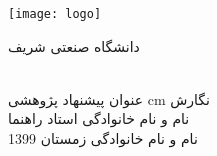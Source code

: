 \begin{center}
\thispagestyle{empty}
\texttt{[image: logo]}

\begin{large}
دانشگاه صنعتی شریف \\ \fadepart{}
\vskip 0.8cm
\fatype{} \falevel{} \\ \famajor{}

\end{large}
\vskip 2cm
{\large{عنوان پیشنهاد پژوهشی}} 
\vskip 0.5cm
{\titlefont{\textbf{\fatitle}}}
 cm
\large{نگارش} \\ \Large{نام و نام خانوادگی}
\vskip 0.75cm
\large{استاد راهنما} \\ \Large{نام و نام خانوادگی}
\vskip 2cm
\large{زمستان 1399}
\end{center}

